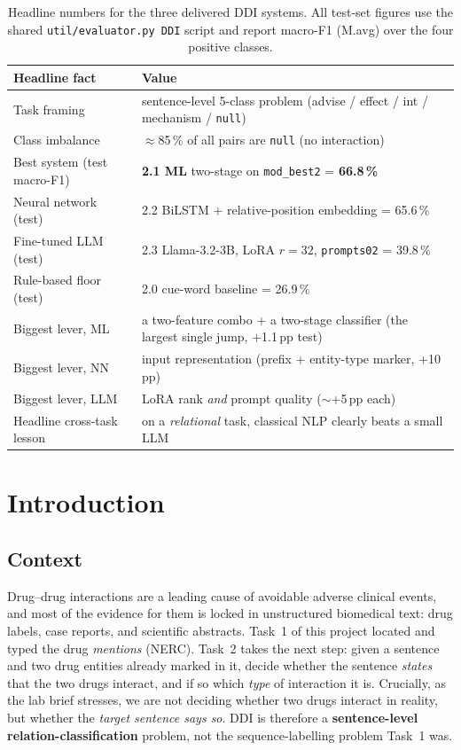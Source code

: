 \documentclass[a4paper,11pt]{article}
\begin{document}
\begin{table}[H]
\centering\small
\renewcommand{\arraystretch}{1.2}
\begin{tabular}{>{\columncolor{upclight}}l l}
\toprule
\textbf{Headline fact} & \textbf{Value} \\
\midrule
Task framing               & sentence-level 5-class problem (advise / effect / int / mechanism / \texttt{null}) \\
Class imbalance            & $\approx$85\,\% of all pairs are \texttt{null} (no interaction) \\
Best system (test macro-F1)& \textbf{2.1 ML} two-stage on \texttt{mod\_best2} = \textbf{66.8\,\%} \\
Neural network (test)      & 2.2 BiLSTM + relative-position embedding = 65.6\,\% \\
Fine-tuned LLM (test)      & 2.3 Llama-3.2-3B, LoRA $r{=}32$, \texttt{prompts02} = 39.8\,\% \\
Rule-based floor (test)    & 2.0 cue-word baseline = 26.9\,\% \\
Biggest lever, ML          & a two-feature combo + a two-stage classifier (the largest single jump, +1.1\,pp test) \\
Biggest lever, NN          & input representation (prefix + entity-type marker, +10\,pp) \\
Biggest lever, LLM         & LoRA rank \emph{and} prompt quality ($\sim$+5\,pp each) \\
Headline cross-task lesson & on a \emph{relational} task, classical NLP clearly beats a small LLM \\
\bottomrule
\end{tabular}
\caption{Headline numbers for the three delivered DDI systems. All test-set figures use the shared \texttt{util/evaluator.py~DDI} script and report macro-F1 (M.avg) over the four positive classes.}
\end{table}

\section{Introduction}

\subsection{Context}
Drug--drug interactions are a leading cause of avoidable adverse
clinical events, and most of the evidence for them is locked in
unstructured biomedical text: drug labels, case reports, and scientific
abstracts. Task~1 of this project located and typed the drug
\emph{mentions} (NERC). Task~2 takes the next step: given a sentence and
two drug entities already marked in it, decide whether the sentence
\emph{states} that the two drugs interact, and if so which \emph{type}
of interaction it is. Crucially, as the lab brief stresses, we are
not deciding whether two drugs interact in reality, but whether the
\emph{target sentence says so}. DDI is therefore a \textbf{sentence-level
relation-classification} problem, not the sequence-labelling problem
Task~1 was.
\end{document}
